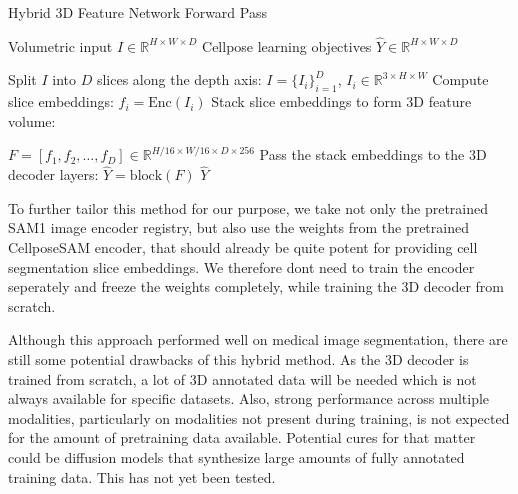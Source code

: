 \begin{algorithm}[H]
\caption{Hybrid 3D Feature Network Forward Pass}
\label{algo:sam3d_forward}
\begin{algorithmic}[1]
\REQUIRE Volumetric input $I \in \mathbb{R}^{H \times W \times D}$
\ENSURE Cellpose learning objectives $\hat{Y} \in \mathbb{R}^{H \times W \times D}$

\STATE Split $I$ into $D$ slices along the depth axis: $I = \{I_i\}_{i=1}^{D}$, $I_i \in \mathbb{R}^{3 \times H \times W}$
    \STATE Compute slice embeddings: $f_i = \text{Enc}(I_i)$ 
\ENDFOR
\STATE Stack slice embeddings to form 3D feature volume: 

$F = [f_1, f_2, \dots, f_D] \in \mathbb{R}^{H/16 \times W/16 \times D \times 256}$
\STATE Pass the stack embeddings to the 3D decoder layers: 
\STATE  
$\hat{Y} = \text{block}(F)$
\ENDFOR
\RETURN $\hat{Y}$
\end{algorithmic}
\end{algorithm}
To further tailor this method for our purpose, we take not only the pretrained SAM1 image encoder registry, but also use the weights from the pretrained CellposeSAM encoder, that should already be quite potent for providing cell segmentation slice embeddings. We therefore dont need to train the encoder seperately and freeze the weights completely, while training the 3D decoder from scratch. 

Although this approach performed well on medical image segmentation, there are still some potential drawbacks of this hybrid method. As the 3D decoder is trained from scratch, a lot of 3D annotated data will be needed which is not always available for specific datasets. Also, strong performance across multiple modalities, particularly on modalities not present during training, is not expected for the amount of pretraining data available. Potential cures for that matter could be diffusion models that synthesize large amounts of fully annotated training data. This has not yet been tested.